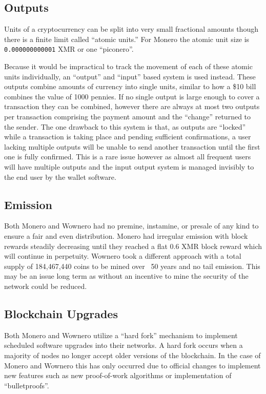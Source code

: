 \subsection{Outputs}
Units of a cryptocurrency can be split into very small fractional amounts though there is a finite limit called ``atomic units.'' For Monero the atomic unit size is \texttt{0.000000000001} XMR or one ``piconero''\cite{moneropedia}.

Because it would be impractical to track the movement of each of these atomic units individually, an ``output'' and ``input'' based system is used instead\cite{bitcoin_whitepaper}. These outputs combine amounts of currency into single units, similar to how a \$10 bill combines the value of 1000 pennies\cite{monero_outputs}. If no single output is large enough to cover a transaction they can be combined, however there are always at most two outputs per transaction comprising the payment amount and the ``change'' returned to the sender\cite{bitcoin_whitepaper}. The one drawback to this system is that, as outputs are ``locked'' while a transaction is taking place and pending sufficient confirmations, a user lacking multiple outputs will be unable to send another transaction until the first one is fully confirmed. This is a rare issue however as almost all frequent users will have multiple outputs and the input output system is managed invisibly to the end user by the wallet software\cite{monero_outputs}.

\subsection{Emission}
Both Monero and Wownero had no premine, instamine, or presale of any kind to ensure a fair and even distribution\cite{monero_about, wowbsite}. Monero had irregular emission with block rewards steadily decreasing until they reached a flat 0.6 XMR block reward which will continue in perpetuity\cite{monero_faq}. Wownero took a different approach with a total supply of 184,467,440 coins to be mined over ~50 years and no tail emission\cite{wowrepo}. This may be an issue long term as without an incentive to mine the security of the network could be reduced\cite{zero2monero}.

\subsection{Blockchain Upgrades}
Both Monero and Wownero utilize a ``hard fork'' mechanism to implement scheduled software upgrades into their networks\cite{wowrepo,monero_repo}. A hard fork occurs when a majority of nodes no longer accept older versions of the blockchain\cite{hard_fork}. In the case of Monero and Wownero this has only occurred due to official changes to implement new features such as new proof-of-work algorithms or implementation of ``bulletproofs''\cite{monero_repo}.

